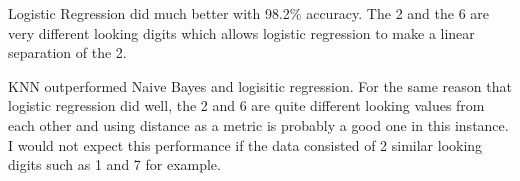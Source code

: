 \documentclass[twoside,10pt]{article}
\begin{document}
\begin{enumerate}
Logistic Regression did much better with 98.2\% accuracy.  The 2 and the 6 are very different looking digits which allows logistic regression to make a linear separation of the 2.

KNN outperformed Naive Bayes and logisitic regression.  For the same reason that logistic regression did well, the 2 and 6 are quite different looking values from each other and using distance as a metric is probably a good one in this instance.  I would not expect this performance if the data consisted of 2 similar looking digits such as 1 and 7 for example. 









\end{enumerate}
\end{document}
